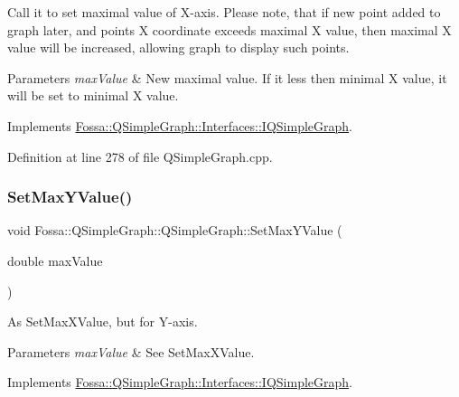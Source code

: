 Call it to set maximal value of X-\/axis. Please note, that if new point added to graph later, and point\textquotesingle{}s X coordinate exceeds maximal X value, then maximal X value will be increased, allowing graph to display such points. 


\begin{DoxyParams}{Parameters}
{\em max\+Value} & New maximal value. If it less then minimal X value, it will be set to minimal X value. \\
\hline
\end{DoxyParams}


Implements \hyperlink{class_fossa_1_1_q_simple_graph_1_1_interfaces_1_1_i_q_simple_graph_a04e7ec46c2be46257bef53c7bf978a2a}{Fossa\+::\+Q\+Simple\+Graph\+::\+Interfaces\+::\+I\+Q\+Simple\+Graph}.



Definition at line 278 of file Q\+Simple\+Graph.\+cpp.

\mbox{\label{class_fossa_1_1_q_simple_graph_1_1_q_simple_graph_a6cb6eee80dc489f300e32263833cf1cd}} 
\subsubsection{\texorpdfstring{Set\+Max\+Y\+Value()}{SetMaxYValue()}}
{\footnotesize\ttfamily void Fossa\+::\+Q\+Simple\+Graph\+::\+Q\+Simple\+Graph\+::\+Set\+Max\+Y\+Value (\begin{DoxyParamCaption}\item[{double}]{max\+Value }\end{DoxyParamCaption})\hspace{0.3cm}{\ttfamily [virtual]}}



As Set\+Max\+X\+Value, but for Y-\/axis. 


\begin{DoxyParams}{Parameters}
{\em max\+Value} & See Set\+Max\+X\+Value. \\
\hline
\end{DoxyParams}


Implements \hyperlink{class_fossa_1_1_q_simple_graph_1_1_interfaces_1_1_i_q_simple_graph_a09e04c116810e79ca1663d2075477746}{Fossa\+::\+Q\+Simple\+Graph\+::\+Interfaces\+::\+I\+Q\+Simple\+Graph}.



